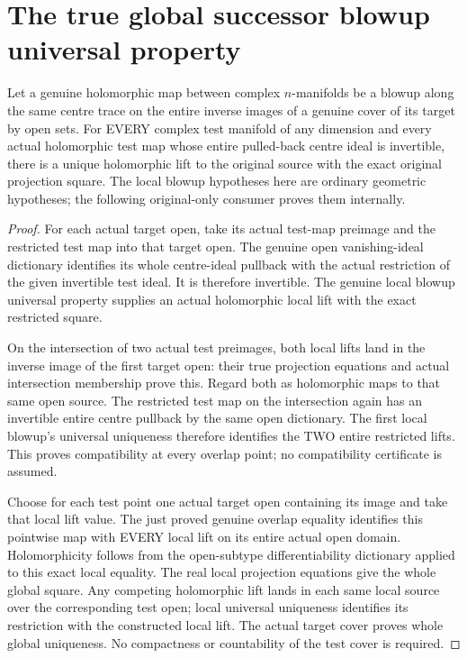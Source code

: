 \section{The true global successor blowup universal property}

\begin{theorem}
\label{hir:sharp-actual-blowup-universal-open-gluing}
\leanok
Let a genuine holomorphic map between complex $n$-manifolds be a blowup
along the same centre trace on the entire inverse images of a genuine
cover of its target by open sets. For EVERY complex test manifold of any
dimension and every actual holomorphic test map whose entire pulled-back
centre ideal is invertible, there is a unique holomorphic lift to the
original source with the exact original projection square. The local
blowup hypotheses here are ordinary geometric hypotheses; the following
original-only consumer proves them internally.
\end{theorem}
\begin{proof}
For each actual target open, take its actual test-map preimage and the
restricted test map into that target open. The genuine open vanishing-ideal
dictionary identifies its whole centre-ideal pullback with the actual
restriction of the given invertible test ideal. It is therefore invertible.
The genuine local blowup universal property supplies an actual holomorphic
local lift with the exact restricted square.

On the intersection of two actual test preimages, both local lifts land
in the inverse image of the first target open: their true projection
equations and actual intersection membership prove this. Regard both as
holomorphic maps to that same open source. The restricted test map on the
intersection again has an invertible entire centre pullback by the same
open dictionary. The first local blowup's universal uniqueness therefore
identifies the TWO entire restricted lifts. This proves compatibility at
every overlap point; no compatibility certificate is assumed.

Choose for each test point one actual target open containing its image
and take that local lift value. The just proved genuine overlap equality
identifies this pointwise map with EVERY local lift on its entire actual
open domain. Holomorphicity follows from the open-subtype differentiability
dictionary applied to this exact local equality. The real local projection
equations give the whole global square. Any competing holomorphic lift
lands in each same local source over the corresponding test open; local
universal uniqueness identifies its restriction with the constructed
local lift. The actual target cover proves whole global uniqueness.
No compactness or countability of the test cover is required.
\end{proof}

